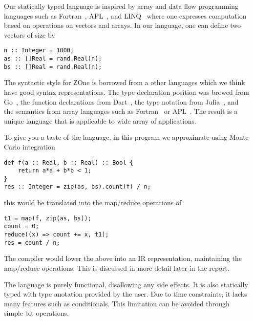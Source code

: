 
Our statically typed language is inspired by array and data flow
programming languages such as Fortran~\cite{Fortran}, APL~\cite{APL}, and
LINQ~\cite{LINQ} where one expresses computation based on operations on
vectors and arrays. In our language, one can define two vectors of size
 by

\begin{verbatim}
n :: Integer = 1000;
as :: []Real = rand.Real(n);
bs :: []Real = rand.Real(n); 
\end{verbatim}


The syntactic style for ZOne is borrowed from a other languages
	which we think have good syntax representations.
The type declaration position was browed from Go~\cite{golang},
	the function declarations from Dart~\cite{dartlang},
	the type notation from Julia~\cite{julialang},
	and the semantics from array languages such as Fortran~\cite{Fortran} or APL~\cite{APL}.
The result is a unique language that is applicable to wide array
	of applications.



To give you a taste of the language, in this program we approximate
 using Monte Carlo integration

\begin{verbatim}
def f(a :: Real, b :: Real) :: Bool {
    return a*a + b*b < 1;
}
res :: Integer = zip(as, bs).count(f) / n;
\end{verbatim}

this would be translated into the map/reduce operations of

\begin{verbatim}
t1 = map(f, zip(as, bs));
count = 0;
reduce((x) => count += x, t1);
res = count / n;
\end{verbatim}

The compiler would lower the above into an IR representation,
maintaining the map/reduce operations. This is discussed 
in more detail later in the report.


The language is purely functional, disallowing any side effects.
It is also statically typed with type anotation provided by the user.
Due to time constraints, it lacks many features such as conditionals.
This limitation can be avoided through simple bit operations.


